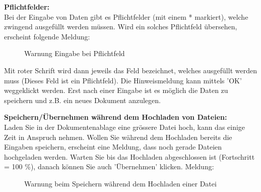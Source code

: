 \vspace{\baselineskip}

\textbf{Pflichtfelder:}\\
Bei der Eingabe von Daten gibt es Pflichtfelder (mit einem * markiert), welche zwingend ausgefüllt werden müssen. Wird ein solches Pflichtfeld übersehen, erscheint folgende Meldung:

\begin{figure}[H]
\caption{Warnung Eingabe bei Pflichtfeld}
\end{figure}

Mit roter Schrift wird dann jeweils das Feld bezeichnet, welches ausgefüllt werden muss (Dieses Feld ist ein Pflichtfeld). Die Hinweismeldung kann mittels 'OK' weggeklickt werden. Erst nach einer Eingabe ist es möglich die Daten zu speichern und z.B. ein neues Dokument anzulegen. 

\vspace{\baselineskip}

\textbf{Speichern/Übernehmen während dem Hochladen von Dateien:}\\
Laden Sie in der Dokumentenablage eine grössere Datei hoch, kann das einige Zeit in Anspruch nehmen. Wollen Sie während dem Hochladen bereits die Eingaben speichern, erscheint eine Meldung, dass noch gerade Dateien hochgeladen werden. Warten Sie bis das Hochladen abgeschlossen ist (Fortschritt = 100 \%), danach können Sie auch 'Übernehmen' klicken. Meldung:

\begin{figure}[H]
\caption{Warnung beim Speichern während dem Hochladen einer Datei}
\end{figure}

